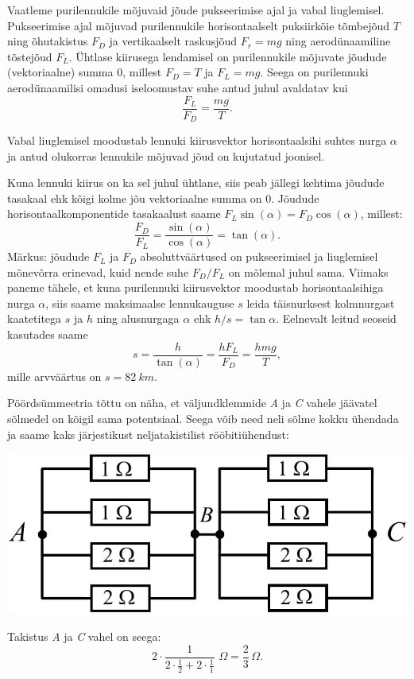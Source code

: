 \documentclass[10pt]{article}
\begin{document}
Vaatleme purilennukile mõjuvaid jõude pukseerimise ajal ja vabal liuglemisel. Pukseerimise ajal mõjuvad purilennukile horisontaalselt puksiirköie tõmbejõud $T$ ning õhutakistus $F_D$ ja vertikaalselt raskusjõud $F_r = mg$ ning aerodünaamiline tõstejõud $F_L$. Ühtlase kiirusega lendamisel on purilennukile mõjuvate jõudude (vektoriaalne) summa 0, millest $F_D = T$ ja $F_L = mg$. Seega on purilennuki aerodünaamilisi omadusi iseloomustav suhe antud juhul avaldatav kui
\begin{equation}
	\frac{F_L}{F_D} = \frac{mg}{T}.
\end{equation}

Vabal liuglemisel moodustab lennuki kiirusvektor horisontaalsihi suhtes nurga $\alpha$ ja antud olukorras lennukile mõjuvad jõud on kujutatud joonisel.


Kuna lennuki kiirus on ka sel juhul ühtlane, siis peab jällegi kehtima jõudude tasakaal ehk kõigi kolme jõu vektoriaalne summa on 0. Jõudude horisontaalkomponentide tasakaalust saame $F_L\sin(\alpha) = F_D\cos(\alpha)$, millest:
\begin{equation}
	\frac{F_D}{F_L} = \frac{\sin(\alpha)}{\cos(\alpha)}=\tan(\alpha).
\end{equation}
Märkus: jõudude $F_L$ ja $F_D$ absoluttväärtused on pukseerimisel ja liuglemisel mõnevõrra erinevad, kuid nende suhe $F_D/F_L$ on mõlemal juhul sama.
Viimaks paneme tähele, et kuna purilennuki kiirusvektor moodustab horisontaalsihiga nurga $\alpha$, siis saame maksimaalse lennukauguse $s$ leida täisnurksest kolmnurgast kaatetitega $s$ ja $h$ ning alusnurgaga $\alpha$ ehk $h/s = \tan{\alpha}$. Eelnevalt leitud seoseid kasutades saame
\begin{equation}
s = \frac{h}{\tan(\alpha)} = \frac{hF_L}{F_D} = \frac{hmg}{T},
\end{equation}
mille arvväärtus on $s = \SI{82}{km}$.
\probend
\bigskip

\setAuthor{}

\solu
\osa Pöördsümmeetria tõttu on näha, et väljundklemmide \emph{A} ja \emph{C} vahele jäävatel sõlmedel on kõigil sama potentsiaal. Seega võib need neli sõlme kokku ühendada ja saame kaks järjestikust neljatakistilist rööbitiühendust:\\
\begin{center}
\includegraphics[scale=0.8]{2020-v3g-05-yl1.pdf}\\
\end{center}
Takistus \emph{A} ja \emph{C} vahel on seega: $$2 \cdot \frac{1}{\displaystyle{2 \cdot \frac{1}{2} + 2 \cdot \frac{1}{1}}} \,\, \SI{}\Omega=\frac{2}{3} \, \SI{}\Omega.$$
\end{document}
